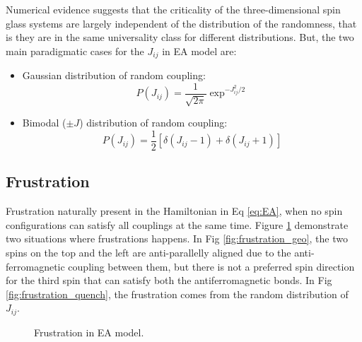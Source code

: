 Numerical evidence suggests that the criticality of the three-dimensional
spin glass systems are largely independent of the distribution of the randomness,
that is they are in the same universality class for different distributions. 
But, the two main paradigmatic cases for the $J_{ij}$ in EA model are:
\begin{itemize}
\item Gaussian distribution of random coupling:
  \begin{equation}
    \label{eq:Jij_Gaussian}
    P(J_{ij})=\frac{1}{\sqrt{2\pi}}\exp^{-J_{ij}^2/2}
  \end{equation}
\item Bimodal ($\pm J$) distribution of random coupling:
  \begin{equation}
    \label{eq:Jij_bimodal}
    P(J_{ij})=\frac{1}{2}[\delta(J_{ij}-1)+\delta(J_{ij}+1)]
  \end{equation}
\end{itemize}

\subsection{Frustration}
\label{sec:frustration}
Frustration naturally present in the Hamiltonian in Eq \ref{eq:EA}, when no spin 
configurations can satisfy all couplings at the same time. 
Figure \ref{fig:frustration} demonstrate two situations where frustrations 
happens. In Fig \ref{fig:frustration_geo}, the two spins on the top and the left
are anti-parallelly aligned due to the anti-ferromagnetic coupling between them,
but there is not a preferred spin direction for the third spin that can satisfy
both the antiferromagnetic bonds. In Fig \ref{fig:frustration_quench}, the 
frustration comes from the random distribution of $J_{ij}$. 

\begin{figure}
  \centering
  \hspace{0.5cm}
  \caption{Frustration in EA model.}
  \label{fig:frustration}
\end{figure}

